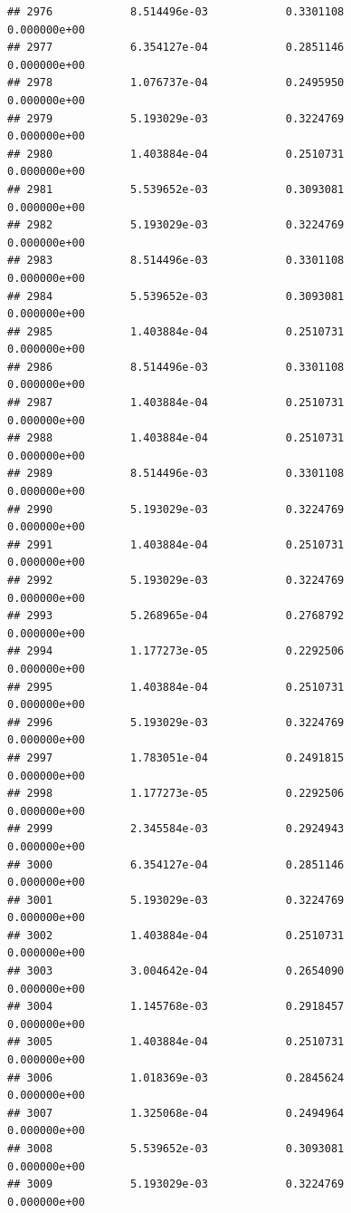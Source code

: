\documentclass[
]{article}
\begin{document}
\begin{verbatim}
## 2976            8.514496e-03            0.3301108            0.000000e+00
## 2977            6.354127e-04            0.2851146            0.000000e+00
## 2978            1.076737e-04            0.2495950            0.000000e+00
## 2979            5.193029e-03            0.3224769            0.000000e+00
## 2980            1.403884e-04            0.2510731            0.000000e+00
## 2981            5.539652e-03            0.3093081            0.000000e+00
## 2982            5.193029e-03            0.3224769            0.000000e+00
## 2983            8.514496e-03            0.3301108            0.000000e+00
## 2984            5.539652e-03            0.3093081            0.000000e+00
## 2985            1.403884e-04            0.2510731            0.000000e+00
## 2986            8.514496e-03            0.3301108            0.000000e+00
## 2987            1.403884e-04            0.2510731            0.000000e+00
## 2988            1.403884e-04            0.2510731            0.000000e+00
## 2989            8.514496e-03            0.3301108            0.000000e+00
## 2990            5.193029e-03            0.3224769            0.000000e+00
## 2991            1.403884e-04            0.2510731            0.000000e+00
## 2992            5.193029e-03            0.3224769            0.000000e+00
## 2993            5.268965e-04            0.2768792            0.000000e+00
## 2994            1.177273e-05            0.2292506            0.000000e+00
## 2995            1.403884e-04            0.2510731            0.000000e+00
## 2996            5.193029e-03            0.3224769            0.000000e+00
## 2997            1.783051e-04            0.2491815            0.000000e+00
## 2998            1.177273e-05            0.2292506            0.000000e+00
## 2999            2.345584e-03            0.2924943            0.000000e+00
## 3000            6.354127e-04            0.2851146            0.000000e+00
## 3001            5.193029e-03            0.3224769            0.000000e+00
## 3002            1.403884e-04            0.2510731            0.000000e+00
## 3003            3.004642e-04            0.2654090            0.000000e+00
## 3004            1.145768e-03            0.2918457            0.000000e+00
## 3005            1.403884e-04            0.2510731            0.000000e+00
## 3006            1.018369e-03            0.2845624            0.000000e+00
## 3007            1.325068e-04            0.2494964            0.000000e+00
## 3008            5.539652e-03            0.3093081            0.000000e+00
## 3009            5.193029e-03            0.3224769            0.000000e+00

\end{verbatim}
\end{document}
